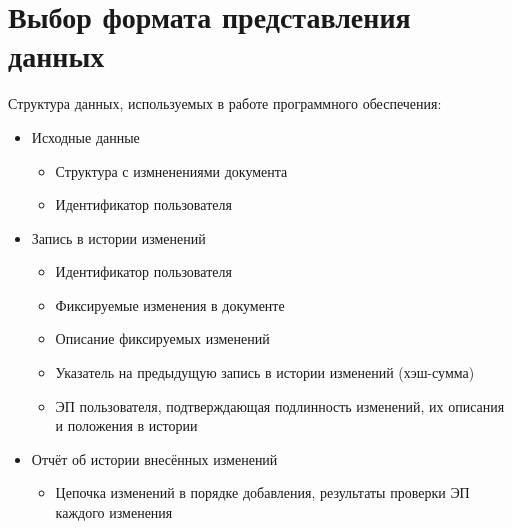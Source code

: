 \section{Выбор формата представления данных} \label{technologic_data}

Структура данных, используемых в работе программного обеспечения:
\begin{itemize}
	\item Исходные данные
	\begin{itemize}
		\item Структура с измненениями документа
		\item Идентификатор пользователя
	\end{itemize}
	\item Запись в истории изменений
	\begin{itemize}
		\item Идентификатор пользователя
		\item Фиксируемые изменения в документе
		\item Описание фиксируемых изменений
		\item Указатель на предыдущую запись в истории изменений (хэш-сумма)
		\item ЭП пользователя, подтверждающая подлинность изменений, их описания и положения в истории
	\end{itemize}
	\item Отчёт об истории внесённых изменений
	\begin{itemize}
		\item Цепочка изменений в порядке добавления, результаты проверки ЭП каждого изменения
	\end{itemize}
\end{itemize}